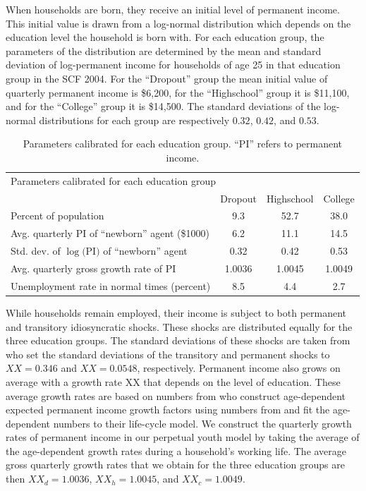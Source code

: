\documentclass[../HAFiscal]{subfiles}
\begin{document}
When households are born, they receive an initial level of permanent income. This initial value is drawn from a log-normal distribution which depends on the education level the household is born with. For each education group, the parameters of the distribution are determined by the mean and standard deviation of log-permanent income for households of age 25 in that education group in the SCF 2004. For the ``Dropout'' group the mean initial value of quarterly permanent income is \$6,200, for the ``Highschool'' group it is \$11,100, and for the ``College'' group it is \$14,500. The standard deviations of the log-normal distributions for each group are respectively $0.32$, $0.42$, and $0.53$. 

\begin{table}[th]
\begin{center}
\begin{tabular}{lccc}
	\toprule 
	\multicolumn{4}{l}{Parameters calibrated for each education group} \\ 
	& Dropout & Highschool & College \\ \midrule
	Percent of population & \phantom{0}9.3 & 52.7 & 38.0 \\ 
	Avg. quarterly PI of ``newborn'' agent (\$1000) & \phantom{0}6.2 & 11.1 & 14.5 \\
	Std. dev. of $\log($PI$)$ of ``newborn'' agent & 0.32 & 0.42 & 0.53 \\
	Avg. quarterly gross growth rate of PI & 1.0036 & 1.0045 & 1.0049 \\
	Unemployment rate in normal times (percent) & \phantom{0}8.5 & \phantom{0}4.4 & \phantom{0}2.7  			
	\\ \bottomrule 
\end{tabular}
\caption{Parameters calibrated for each education group. ``PI'' refers to permanent income.}
\label{tab:calibEd}
\end{center}
\end{table}

While households remain employed, their income is subject to both permanent and transitory idiosyncratic shocks. These shocks are distributed equally for the three education groups. The standard deviations of these shocks are taken from \citet{carroll2020sticky} who set the standard deviations of the transitory and permanent shocks to $XX=0.346$ and $XX=0.0548$, respectively. Permanent income also grows on average with a growth rate XX that depends on the level of education. These average growth rates are based on numbers from \citet{carroll2020modeling} who construct age-dependent expected permanent income growth factors using numbers from \citet{cagetti2003wealth} and fit the age-dependent numbers to their life-cycle model. We construct the quarterly growth rates of permanent income in our perpetual youth model by taking the average of the age-dependent growth rates during a household's working life. The average gross quarterly growth rates that we obtain for the three education groups are then $XX_d=1.0036$, $XX_h=1.0045$, and $XX_c=1.0049$.
\end{document}
